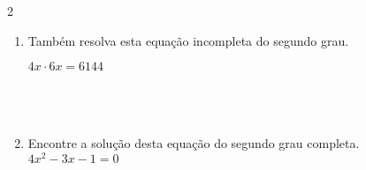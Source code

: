 \documentclass[a4paper,14pt]{article}
\begin{document}
\begin{multicols}{2}
\begin{enumerate}
        $4x^2 - 36 = 0$  \\ \\ \\ \\ \\ \\ \\ \\ \\ \\ \\ \\ \\ 
        $x^2 - 64x = 0$  \\ \\ \\ \\ \\ \\ \\ \\ \\ \\ \\ \\ \\ 
        $2x^2 - 8x = 0$   \\ \\ \\ \\ \\ \\ \\ \\ \\ \\ \\ \\ \\ \\ \\
        
        \item Também resolva esta equação incompleta do segundo grau.
        
        $4x \cdot 6x = 6144$ \\ \\ \\ \\
        
        \item Encontre a solução desta equação do segundo grau completa.
        \\
        $4x^2 - 3x -1 = 0$
        \vspace{8cm}
		
    \end{enumerate}        
    \end{multicols}    
\end{document}
